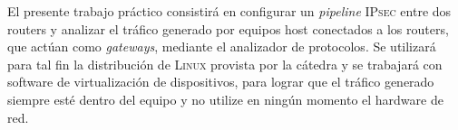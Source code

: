 

	El presente trabajo práctico consistirá en configurar un \emph{pipeline} \textsc{IPsec} entre dos routers y analizar el tráfico generado por equipos host conectados a los routers, que actúan como \emph{gateways}, mediante el analizador de protocolos. Se utilizará para tal fin la distribución de \textsc{Linux} provista por la cátedra y se trabajará con software de virtualización de dispositivos, para lograr que el tráfico generado siempre esté dentro del equipo y no utilize en ningún momento el hardware de red.

